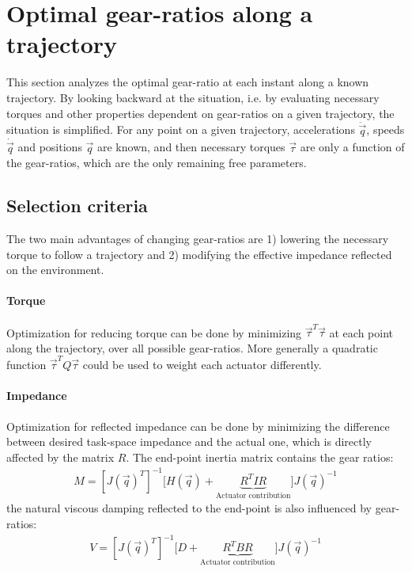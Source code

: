 
\newpage

\section{Optimal gear-ratios along a trajectory}
\label{sec:optigeartraj}

This section analyzes the optimal gear-ratio at each instant along a known trajectory. By looking backward at the situation,  i.e. by evaluating necessary torques and other properties dependent on gear-ratios on a given trajectory, the situation is simplified. For any point on a given trajectory, accelerations $\ddot{\vec{q}}$, speeds $\dot{\vec{q}}$ and positions $\vec{q}$ are known, and then necessary torques $\vec{\tau}$ are only a function of the gear-ratios, which are the only remaining free parameters.

\subsection{Selection criteria}
\label{sec:GearSelectionCriteria}

The two main advantages of changing gear-ratios are 1) lowering the necessary torque to follow a trajectory and 2) modifying the effective impedance reflected on the environment. 

\paragraph{Torque}
Optimization for reducing torque can be done by minimizing $\vec{\tau}^T \vec{\tau}$ at each point along the trajectory, over all possible gear-ratios. More generally a quadratic function $\vec{\tau}^T Q \vec{\tau}$ could be used to weight each actuator differently.

\paragraph{Impedance}
Optimization for reflected impedance can be done by minimizing the difference between desired task-space impedance and the actual one, which is directly affected by the matrix $R$. The end-point inertia matrix contains the gear ratios: 
%
\begin{align}
	M = [J(\vec{q})^T]^{-1} \big [ H( \vec{q} )  + \underbrace{ R^T I R }_{\text{Actuator contribution}}  \big ] J(\vec{q})^{-1}
 \label{eq:endpointmass}
\end{align}
%
the natural viscous damping reflected to the end-point is also influenced by gear-ratios:
\begin{align}
	V = [J(\vec{q})^T]^{-1} \big [ D + \underbrace{ R^T B R }_{\text{Actuator contribution}}  \big ] J(\vec{q})^{-1}
 \label{eq:endpointdamp}
\end{align}

